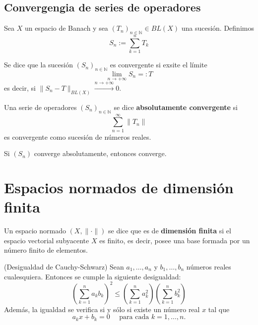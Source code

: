 \documentclass[12pt]{book}
\newcommand{\tbf}{\textbf}
\newcommand{\N}{\mathbb{N}}
\begin{document}
\subsection{Convergengia de series de operadores}

\noindent 
Sea $X$ un espacio de Banach y sea $(T_n)_{n\in\N} \in BL(X)$ una sucesión. Definimos 
$$S_n := \sum_{k=1}^{n} T_k$$

\begin{definicion}
    Se dice que la sucesión $(S_n)_{n\in\N}$ es convergente si exsite el límite
    \begin{equation*}
        \lim_{n \to +\infty} S_n =: T
    \end{equation*}
    es decir, si $\|S_n - T\|_{BL(X)} \xrightarrow{n \to +\infty} 0$.
\end{definicion}

\begin{definicion}
    Una serie de operadores $(S_n)_{n\in\N}$ se dice \tbf{absolutamente convergente} si 
    $$\sum_{n=1}^{\infty} \|T_n\|$$
    es convergente como sucesión de números reales.
\end{definicion}

\begin{observacion}
    Si $(S_n)$ converge absolutamente, entonces converge.
\end{observacion}



\section{Espacios normados de dimensión finita}


\begin{definicion}
    Un espacio normado $(X, \|\cdot\|)$ se dice que es de \textbf{dimensión finita} si el espacio vectorial subyacente $X$ es finito, es decir, posee una base formada por un número finito de elementos.
\end{definicion}

\begin{prop}(Desigualdad de Cauchy-Schwarz)
    Sean $a_1, \dots, a_n$ y $b_1, \dots, b_n$ números reales cualesquiera. Entonces se cumple la siguiente desigualdad:
    \begin{equation*}
        \left( \sum_{k=1}^n a_k b_k \right)^2 \leq \left( \sum_{k=1}^n a_k^2 \right) \left( \sum_{k=1}^n b_k^2 \right)
    \end{equation*}
    Además, la igualdad se verifica si y sólo si existe un número real $x$ tal que
    \begin{equation*}
        a_k x + b_k = 0 \quad \text{ para cada } k = 1, \dots, n.
    \end{equation*}
\end{prop}
\end{document}

